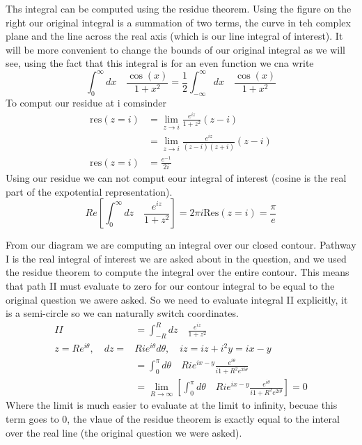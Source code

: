 \documentclass{article}
\newcommand{\be}{\begin{equation}}
\newcommand{\ee}{\end{equation}}
\begin{document}
Ths integral can be computed using the residue theorem.
Using the figure on the right our original integral is a summation of two terms, the curve in teh complex plane and the line across the real axis (which is our line integral of interest). 
It will be more convenient to change the bounds of our original integral as we will see, using the fact that this integral is for an even function we cna write
\be
\int_0^\infty dx \quad \frac{\cos(x)}{1+x^2} = \frac{1}{2} \int_{-\infty}^\infty dx \quad \frac{\cos(x)}{1+x^2}
\ee
To comput our residue at i comsinder
\be
\begin{split}
    \text{res}(z=i) &=  \lim_{z \rightarrow i}{\frac{e^{iz}}{1+z^2}(z-i)}\\
    &=  \lim_{z \rightarrow i}{\frac{e^{iz}}{(z-i)(z+i)}(z-i)}\\
    \text{res}(z=i) &= \frac{e^{-1}}{2i}
\end{split}
\ee
Using our residue we can not comput eour integral of interest (cosine is the real part of the expotential representation). 
\be
Re\left[\int_0^\infty dz \quad \frac{e^{iz}}{1+z^2}\right] = 2\pi i \text{Res}(z=i) = \frac{\pi}{e}
\ee

From our diagram we are computing an integral over our closed contour.
Pathway I is the real integral of interest we are asked about in the question, and we used the residue theorem to compute the integral over the entire contour.
This means that path II must evaluate to zero for our contour integral to be equal to the original question we awere asked.
So we need to evaluate integral II explicitly, it is a semi-circle so we can naturally switch coordinates.
\be
\begin{split}
    II &= \int_{-R}^R dz \quad \frac{e^{iz}}{1+z^2}\\
    z = Re^{i\theta}, \quad dz = & Rie^{i\theta}d\theta, \quad iz = iz + i^2y = ix-y\\
    &= \int_0^\pi d\theta \quad Rie^{ix-y} \frac{e^{i\theta}}{i1+R^2e^{2i\theta}}\\
    &= \lim_{R \rightarrow \infty}{\left[\int_0^\pi d\theta \quad Rie^{ix-y} \frac{e^{i\theta}}{i1+R^2e^{2i\theta}}\right]} = 0
\end{split}
\ee
Where the limit is much easier to evaluate at the limit to infinity, becuae this term goes to 0, the vlaue of the residue theorem is exactly equal to the interal over the real line (the original question we were asked). 
\end{document}
